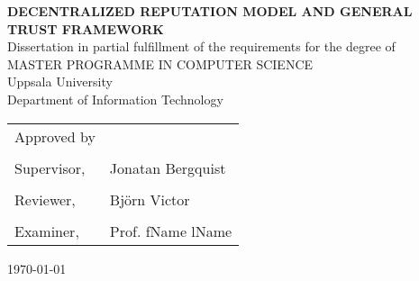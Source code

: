 
\thispagestyle{empty}

\vspace*{+5em}
\begin{center}
\textbf{DECENTRALIZED REPUTATION MODEL AND GENERAL TRUST FRAMEWORK}\\
\vspace*{+4em}
Dissertation in partial fulfillment of the requirements for the degree of\\
\vspace{+2em}
MASTER PROGRAMME IN COMPUTER SCIENCE\\

\vspace*{+3em}
Uppsala University\\
Department of Information Technology\\
\vspace*{+2em}

\end{center}

\begin{tabular}{ l l }
 Approved by &   \\
  & \\
  Supervisor, & Jonatan Bergquist \\ 
  & \\
  Reviewer, & Björn Victor \\
  & \\
 Examiner, & Prof. fName lName \\ 
\end{tabular}

\vspace*{+4em}

\begin{center}
\today
\end{center}
